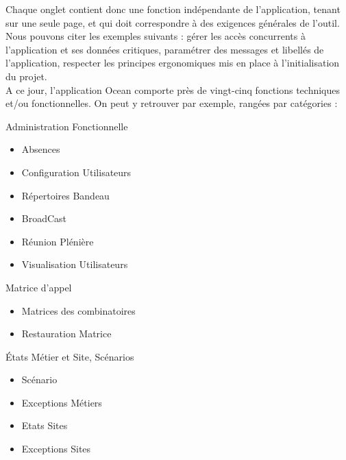 \documentclass{rapport}
\begin{document}
Chaque onglet contient donc une fonction indépendante de l'application, tenant sur une seule page, et qui doit correspondre à des exigences générales de l'outil. Nous pouvons citer les exemples suivants : gérer les accès concurrents à l'application et ses données critiques, paramétrer des messages et libellés de l'application, respecter les principes ergonomiques mis en place à l'initialisation du projet.\\

A ce jour, l'application Ocean comporte près de vingt-cinq fonctions techniques et/ou fonctionnelles. On peut y retrouver par exemple, rangées par catégories :

\vspace{5mm} %
\begin{itemize}

\begin{minipage}{0.5\textwidth}
\item Administration Fonctionnelle
        \begin{itemize}
        \item Absences
        \item Configuration Utilisateurs
        \item Répertoires Bandeau
        \item BroadCast
        \item Réunion Plénière
        \item Visualisation Utilisateurs
        \end{itemize}
    \vspace{5mm} %
    \item Matrice d'appel
        \begin{itemize}
        \item Matrices des combinatoires
        \item Restauration Matrice
        \end{itemize}
    \vspace{5mm} %
    \item États Métier et Site, Scénarios
        \begin{itemize}
        \item Scénario
        \item Exceptions Métiers
        \item Etats Sites
        \item Exceptions Sites
        \end{itemize}
\end{minipage}

\end{itemize}
\end{document}
